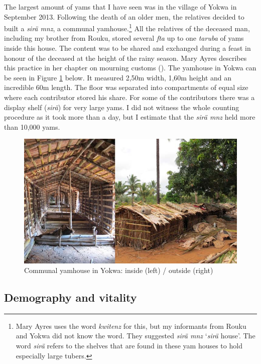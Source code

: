 The largest amount of yams that I have seen was in the village of Yokwa in September 2013. Following the death of an older men, the relatives decided to built a \emph{sirä mnz}, a communal yamhouse.\footnote{Mary Ayres uses the word \emph{kwitenz} for this, but my informants from Rouku and Yokwa did not know the word. They suggested \emph{sirä mnz} `\emph{sirä} house'. The word \emph{sirä} refers to the shelves that are found in these yam houses to hold especially large tubers.} All the relatives of the deceased man, including my brother from Rouku, stored several \emph{fta} up to one \emph{taruba} of yams inside this house. The content was to be shared and exchanged during a feast in honour of the deceased at the height of the rainy season. Mary Ayres describes this practice in her chapter on mourning customs (\citeyear[289]{Ayres:ws}). The yamhouse in Yokwa can be seen in Figure \ref{fig:yam4} below. It measured 2,50m width, 1,60m height and an incredible 60m length. The floor was separated into compartments of equal size where each contributor stored his share. For some of the contributors there was a display shelf (\emph{sirä}) for very large yams. I did not witness the whole counting procedure as it took more than a day, but I estimate that the \emph{sirä mnz} held more than 10,000 yams.

\begin{figure}
  
    \includegraphics[width=.9\textwidth]{figures/yam4.jpg}
  \caption[Communal yamhouse in Yokwa]{Communal yamhouse in Yokwa: inside (left) / outside (right)}
  \label{fig:yam4}
\end{figure}

\subsection{Demography and vitality}


